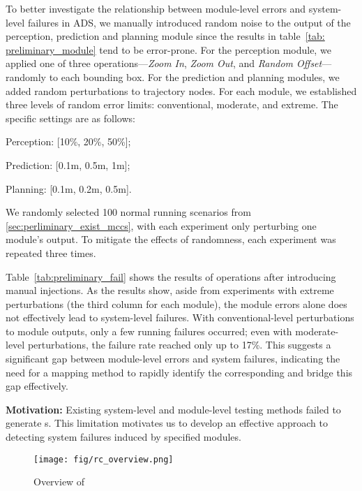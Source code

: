 To better investigate the relationship between module-level errors and system-level failures in ADS, we manually introduced random noise to the output of the perception, prediction and planning module since the results in table~\ref{tab: preliminary_module} tend to be error-prone. For the perception module, we applied one of three operations—\textit{Zoom In}, \textit{Zoom Out}, and \textit{Random Offset}—randomly to each bounding box. For the prediction and planning modules, we added random perturbations to trajectory nodes. For each module, we established three levels of random error limits: conventional, moderate, and extreme. The specific settings are as follows:
\begin{inparaitem}
    \item Perception: [10\%, 20\%, 50\%];
    \item Prediction: [0.1m, 0.5m, 1m];
    \item Planning: [0.1m, 0.2m, 0.5m].
\end{inparaitem}
We randomly selected 100 normal running scenarios from \ref{sec:perliminary_exist_mccs}, with each experiment only perturbing one module's output. To mitigate the effects of randomness, each experiment was repeated three times.


Table~\ref{tab:preliminary_fail} shows the results of operations after introducing manual injections.
As the results show, aside from experiments with extreme perturbations (the third column for each module), the module errors alone does not effectively lead to system-level failures. With conventional-level perturbations to module outputs, only a few running failures occurred; even with moderate-level perturbations, the failure rate reached only up to 17\%. This suggests a significant gap between module-level errors and system failures, indicating the need for a mapping method to rapidly identify the corresponding \mccs and bridge this gap effectively.

\begin{ansbox}
   \textbf{Motivation:} Existing system-level and module-level testing methods failed to generate {\mccs}s. This limitation motivates us to develop an effective approach to detecting system failures induced by specified modules. 
\end{ansbox}


\begin{figure*}[!t]
    \centering
    \texttt{[image: fig/rc\_overview.png]}
    \caption{Overview of \tool}
    \label{fig:overview}
\end{figure*}


